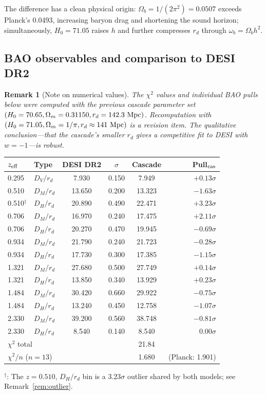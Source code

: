 \documentclass[12pt,a4paper]{article}
\newtheorem*{remark}{Remark}
\begin{document}
The difference has a clean physical origin: $\Omega_b = 1/(2\pi^2) = 0.0507$ exceeds
Planck's 0.0493, increasing baryon drag and shortening the sound horizon; simultaneously,
$H_0 = 71.05$ raises $h$ and further compresses $r_d$ through $\omega_b = \Omega_b h^2$.

\subsection{BAO observables and comparison to DESI DR2}

\begin{remark}[Note on numerical values]
The $\chi^2$ values and individual BAO pulls below were computed with the previous cascade
parameter set $(H_0 = 70.65, \Omega_m = 0.31150, r_d = 142.3~{\rm Mpc})$. Recomputation
with $(H_0 = 71.05, \Omega_m = 1/\pi, r_d \approx 141~{\rm Mpc})$ is a revision item.
The qualitative conclusion---that the cascade's smaller $r_d$ gives a competitive fit to
DESI with $w = -1$---is robust.
\end{remark}

\begin{center}
\small
\begin{tabular}{llcccr}
\hline
$z_{\rm eff}$ & Type & DESI DR2 & $\sigma$ & Cascade & Pull$_{\rm cas}$ \\
\hline
0.295 & $D_V/r_d$ & 7.930 & 0.150 & 7.949 & $+0.13\sigma$ \\
0.510 & $D_M/r_d$ & 13.650 & 0.200 & 13.323 & $-1.63\sigma$ \\
0.510$^\dagger$ & $D_H/r_d$ & 20.890 & 0.490 & 22.471 & $+3.23\sigma$ \\
0.706 & $D_M/r_d$ & 16.970 & 0.240 & 17.475 & $+2.11\sigma$ \\
0.706 & $D_H/r_d$ & 20.270 & 0.470 & 19.945 & $-0.69\sigma$ \\
0.934 & $D_M/r_d$ & 21.790 & 0.240 & 21.723 & $-0.28\sigma$ \\
0.934 & $D_H/r_d$ & 17.730 & 0.300 & 17.385 & $-1.15\sigma$ \\
1.321 & $D_M/r_d$ & 27.680 & 0.500 & 27.749 & $+0.14\sigma$ \\
1.321 & $D_H/r_d$ & 13.850 & 0.340 & 13.929 & $+0.23\sigma$ \\
1.484 & $D_M/r_d$ & 30.420 & 0.660 & 29.922 & $-0.75\sigma$ \\
1.484 & $D_H/r_d$ & 13.240 & 0.450 & 12.758 & $-1.07\sigma$ \\
2.330 & $D_M/r_d$ & 39.200 & 0.560 & 38.748 & $-0.81\sigma$ \\
2.330 & $D_H/r_d$ & 8.540 & 0.140 & 8.540 & $0.00\sigma$ \\
\hline
\multicolumn{4}{l}{$\chi^2$ total} & 21.84 & \\
\multicolumn{4}{l}{$\chi^2/n$ ($n = 13$)} & 1.680 & (Planck: 1.901) \\
\hline
\end{tabular}
\end{center}
\noindent$^\dagger$: The $z = 0.510$, $D_H/r_d$ bin is a $3.23\sigma$ outlier shared by both
models; see Remark~\ref{rem:outlier}.
\end{document}
